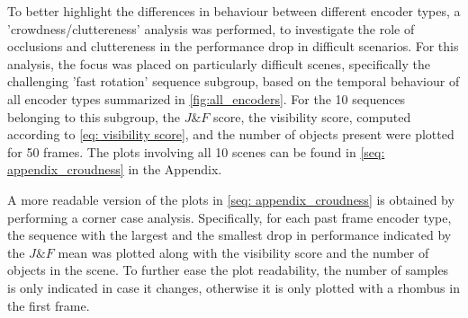 To better highlight the differences in behaviour between different encoder types, a 'crowdness/cluttereness' analysis was performed, to investigate the role of occlusions and cluttereness in the performance drop in difficult scenarios. For this analysis, the focus was placed on particularly difficult scenes, specifically the challenging 'fast rotation' sequence subgroup, based on the temporal behaviour of all encoder types summarized in  \figref\ref{fig:all_encoders}. For the 10 sequences belonging to this subgroup, the $J\&F$ score, the visibility score, computed according to \eqref{eq: visibility score}, and the number of objects present were plotted for 50 frames. The plots involving all 10 scenes can be found in \autoref{seq: appendix_croudness} in the Appendix. \par

A more readable version of the plots in \autoref{seq: appendix_croudness} is obtained by performing a corner case analysis. Specifically,  for each past frame encoder type, the sequence with the largest and the smallest drop in performance indicated by the $J\&F$ mean was plotted along with the visibility score and the number of objects in the scene. To further ease the plot readability, the number of samples is only indicated in case it changes, otherwise it is only plotted with a rhombus in the first frame. \par


\vspace{3mm}

